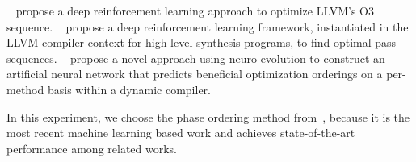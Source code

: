 ~\citet{9306994} propose a deep reinforcement learning approach to optimize LLVM's O3 sequence.
~\citet{haj2020autophase} propose a deep reinforcement learning framework, instantiated in the LLVM compiler context for high-level synthesis programs, to find optimal pass sequences. 
~\citet{kulkarni2012mitigating}  propose a novel approach using neuro-evolution to construct an artificial neural network that predicts beneficial optimization orderings on a per-method basis within a dynamic compiler. 

In this experiment, we choose the phase ordering method from~\citet{haj2020autophase}, because it is the most recent machine learning based work and achieves state-of-the-art performance among related works.








